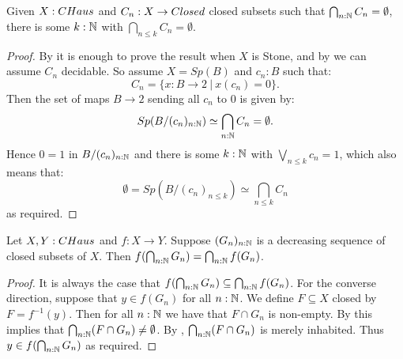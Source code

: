\begin{lemma}\label{CHausFiniteIntersectionProperty}
  Given $X:\Chaus$ and $C_n:X\to \Closed$ closed subsets such that $\bigcap_{n:\mathbb{N}} C_n =\emptyset$, there is some $k:\mathbb{N}$ 
  with $\bigcap_{n\leq k} C_n  = \emptyset$. 
\end{lemma}
\begin{proof}
  By  it is enough to prove the result when $X$ is Stone, and by  we can assume $C_n$ decidable.
  So assume 
  $X=Sp(B)$ and $c_n:B$ such that: 
  \[C_n = \{x:B\to 2\ |\ x(c_n) = 0\}.\]
  Then the set of maps $B\to 2$ sending all $c_n$ to $0$ is given by: 
  \[Sp(B/(c_n)_{n:\N})%
  \simeq \bigcap_{n:\N} C_n = \emptyset .\]
  Hence 
  $0=1$ in $B/(c_n)_{n:\mathbb{N}}$ %
  and there is some $k:\mathbb{N}$ with 
  $\bigvee_{n\leq k} c_n = 1$, which also means that: 
  \[\emptyset = Sp(B/(c_n)_{n\leq k}) %
  \simeq \bigcap_{n\leq k} C_n \]
  as required.
\end{proof}

\begin{corollary}\label{ChausMapsPreserveIntersectionOfClosed}
  Let $X,Y:\CHaus$ and $f:X \to Y$. 
  Suppose $(G_n)_{n:\mathbb{N}}$ is a decreasing sequence of closed subsets of $X$. 
  Then $f(\bigcap_{n:\mathbb{N}} G_n) = \bigcap_{n:\mathbb{N}}f(G_n)$. 
\end{corollary}
\begin{proof}
  It is always the case that $f(\bigcap_{n:\mathbb{N}} G_n) \subseteq \bigcap_{n:\mathbb{N}} f(G_n)$. 
  For the converse direction, suppose that $y \in f(G_n)$ for all $n:\mathbb{N}$. 
  We define $F\subseteq X$ closed by $F=f^{-1}(y)$. 
  Then for all $n:\mathbb{N}$ we have that $F\cap G_n$ is %
  non-empty. 
  By  this implies that $\bigcap_{n:\mathbb{N}}(F\cap G_n) \neq \emptyset$. 
  By ,  %
  $\bigcap_{n:\mathbb{N}} (F\cap G_n)$ is merely inhabited. Thus $y\in f(\bigcap_{n:\mathbb{N}} G_n)$ as required. 
\end{proof}

